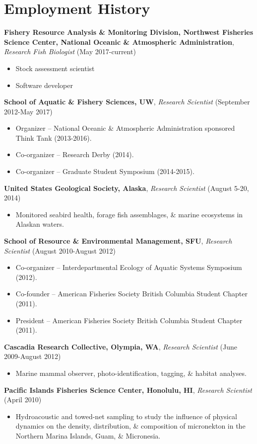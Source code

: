 \documentclass[10pt]{article}
\begin{document}
\section*{Employment History}
\textbf{Fishery Resource Analysis \& Monitoring Division, Northwest Fisheries Science Center, National Oceanic \& Atmospheric Administration}, \textit{Research Fish Biologist} (May 2017-current)
\begin{itemize}
\vspace{-2.5mm}
  \item Stock assessment scientist
  \item Software developer
\end{itemize}
\textbf{School of Aquatic \& Fishery Sciences, UW}, \textit{Research Scientist} (September 2012-May 2017)
\begin{itemize}
\vspace{-2.5mm}
\item Organizer -- National Oceanic \& Atmospheric Administration sponsored Think Tank (2013-2016).
\item Co-organizer -- Research Derby (2014).
\item Co-organizer -- Graduate Student Symposium (2014-2015).
\end{itemize}
\textbf{United States Geological Society, Alaska}, \textit{Research Scientist} (August 5-20, 2014)
\begin{itemize}
\vspace{-2.5mm}
\item Monitored seabird health, forage fish assemblages, \& marine ecosystems in Alaskan waters.
\end{itemize}
\textbf{School of Resource \& Environmental Management, SFU}, \textit{Research Scientist} (August 2010-August 2012)
\begin{itemize}
\vspace{-2.5mm}
\item Co-organizer -- Interdepartmental Ecology of Aquatic Systems Symposium (2012).
\item Co-founder -- American Fisheries Society British Columbia Student Chapter (2011).
\item President -- American Fisheries Society British Columbia Student Chapter (2011).
\end{itemize}
\textbf{Cascadia Research Collective, Olympia, WA}, \textit{Research Scientist} (June 2009-August 2012)
\begin{itemize}
\vspace{-2.5mm}
\item Marine mammal observer, photo-identification, tagging, \& habitat analyses.
\end{itemize}
\textbf{Pacific Islands Fisheries Science Center, Honolulu, HI}, \textit{Research Scientist} (April 2010)
\begin{itemize}
\vspace{-2.5mm}
\item Hydroacoustic and towed-net sampling to study the influence of physical dynamics on the density, distribution, \& composition of micronekton in the Northern Marina Islands, Guam, \& Micronesia.
\end{itemize}
\end{document}
